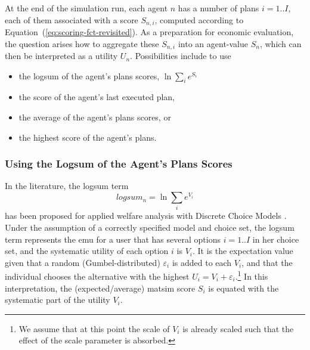 At the end of the simulation run, each agent $n$ has a number of plans $i=1..I$, each of them associated with a score $S_{n,i}$, computed according to Equation~(\ref{eq:scoring-fct-revisited}).
%
%
As a preparation for economic evaluation, the question arises how to aggregate these $S_{n,i}$ into an agent-value $S_n$, which can then be interpreted as a utility $U_n$.  Possibilities include to use
%
%
\begin{itemize}\styleItemize
\item the logsum of the agent's plans scores, \ie $\ln \sum_i e^{S_i}$
\item the score of the agent's last executed plan, 
\item the average of the agent's plans scores, or
\item the highest score of the agent's plans.
\end{itemize}
%

\subsubsection{Using the Logsum of the Agent's Plans Scores}
\label{ch:economicEval:valuingBehavior:output2Eval:logsum}
In the literature, the logsum term 
\[
logsum_n = \ln \sum_i e^{V_i}
\]
has been proposed for applied welfare analysis with Discrete Choice Models \citep{SmallRosen1981AppliedWelfareEconomics, deJongDalyEtAl2006logsum, KohliDaly2006LogsumEvalPRISM, deJongEtAl2007LogsumTRA}.
%
%
Under the assumption of a 
  correctly specified model and choice set,
the logsum term represents the \gls{emu} for a user that has several options $i=1..I$ in her choice set, and the systematic utility of each option $i$ is $V_i$.
%
It is the expectation value given that a random (Gumbel-distributed) $\varepsilon_i$ is added to each $V_i$, and that the individual chooses the alternative with the highest $U_i = V_i + \varepsilon_i$.\footnote{%
%
We assume that at this point the scale of $V_i$ is already scaled such that the effect of the scale parameter is absorbed.
%
} In this interpretation, the 
(expected/average) \acrshort{matsim} score $S_i$ is equated with the systematic part of the utility $V_i$.



